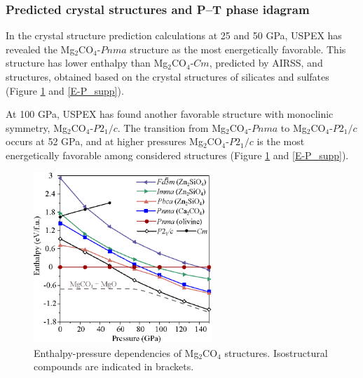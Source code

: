 \documentclass[a4paperm]{article}
\begin{document}
\subsubsection{Predicted crystal structures and P--T phase idagram}
In the crystal structure prediction calculations at 25 and 50 GPa, USPEX has revealed the Mg$_2$CO$_4$-$Pnma$ structure as the most energetically favorable.
This structure has lower enthalpy than Mg$_2$CO$_4$-$Cm$, predicted by AIRSS, and structures, obtained based on the crystal structures of silicates and sulfates (Figure \ref{E-P} and \ref{E-P_supp}).

At 100 GPa, USPEX has found another favorable structure with monoclinic symmetry, Mg$_2$CO$_4$-$P2_1/c$.
The transition from Mg$_2$CO$_4$-$Pnma$ to Mg$_2$CO$_4$-$P2_1/c$ occurs at 52 GPa, and at higher pressures Mg$_2$CO$_4$-$P2_1/c$ is the most energetically favorable among considered structures (Figure \ref{E-P} and \ref{E-P_supp}). 

\begin{figure}[H]
	\includegraphics[width=0.6\textwidth]{E-P_mg2co4} \centering
	\caption{Enthalpy-pressure dependencies of Mg$_2$CO$_4$ structures. Isostructural compounds are indicated in brackets.} \label{E-P}
\end{figure} 
\end{document}
